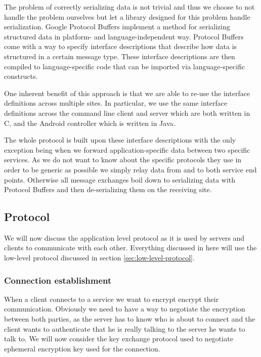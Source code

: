 The problem of correctly serializing data is not trivial and thus we choose to not handle the problem ourselves but let a library designed for this problem handle serialization.
Google Protocol Buffers \cite{varda2008protocol} implement a method for serializing structured data in platform- and language-independent way.
Protocol Buffers come with a way to specify interface descriptions that describe how data is structured in a certain message type.
These interface descriptions are then compiled to language-specific code that can be imported via language-specific constructs.

One inherent benefit of this approach is that we are able to re-use the interface definitions across multiple sites.
In particular, we use the same interface definitions across the command line client and server which are both written in C, and the Android controller which is written in Java.

The whole protocol is built upon these interface descriptions with the only exception being when we forward application-specific data between two specific services.
As we do not want to know about the specific protocols they use in order to be generic as possible we simply relay data from and to both service end points.
Otherwise all message exchanges boil down to serializing data with Protocol Buffers and then de-serializing them on the receiving site.

\subsection{Protocol}

We will now discuss the application level protocol as it is used by servers and clients to communicate with each other.
Everything discussed in here will use the low-level protocol discussed in section \ref{sec:low-level-protocol}.

\subsubsection{Connection establishment}
\label{sec:connection-establishment}

When a client connects to a service we want to encrypt encrypt their communication.
Obviously we need to have a way to negotiate the encryption between both parties, as the server has to know who is about to connect and the client wants to authenticate that he is really talking to the server he wants to talk to.
We will now consider the key exchange protocol used to negotiate ephemeral encryption key used for the connection.

